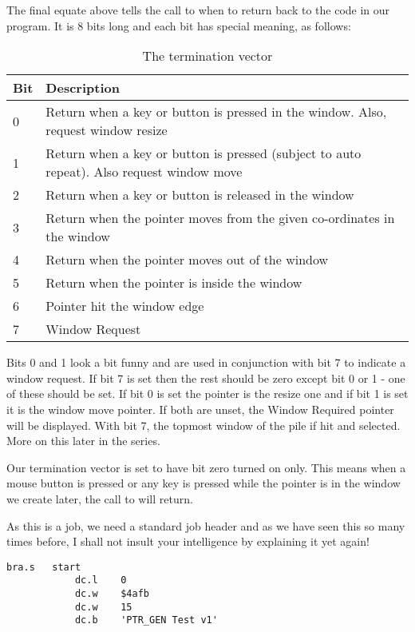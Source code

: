 The final equate above tells the call to  when to return back to the code in
our program. It is 8 bits long and each bit has special meaning, as follows:
\begin{table}[htbp]
\centering
\begin{tabular}{l p{}}
\toprule
\textbf{Bit} & \textbf{Description} \\
\midrule
%
0 & Return when a key or button is pressed in the window. Also, request window resize \\
1 & Return when a key or button is pressed (subject to auto repeat). Also request window move \\
2 & Return when a key or button is released in the window \\
3 & Return when the pointer moves from the given co-ordinates in the window \\
4 & Return when the pointer moves out of the window \\
5 & Return when the pointer is inside the window \\
6 & Pointer hit the window edge \\
7 & Window Request \\
%
\bottomrule
\end{tabular}
\caption{The termination vector}
\label{tab:TerminationVector}
\end{table}

Bits 0 and 1 look a bit funny and are used in conjunction with bit 7 to indicate a
window request. If bit 7 is set then the rest should be zero except bit 0 or 1 -{} one of
these should be set. If bit 0 is set the pointer is the resize one and if bit 1 is set it
is the window move pointer. If both are unset, the Window Required pointer will be
displayed. With bit 7, the topmost window of the pile if hit and selected. More on this
later in the series.

Our termination vector is set to have bit zero turned on only. This means when a
mouse button is pressed or any key is pressed while the pointer is in the window we create
later, the call to  will return.

As this is a job, we need a standard job header and as we have seen this so many
times before, I shall not insult your intelligence by explaining it yet again!

\begin{lstlisting}[firstnumber=last,caption={Simple PE Program - Part 2}]
            bra.s   start
            dc.l    0
            dc.w    $4afb
            dc.w    15
            dc.b    'PTR_GEN Test v1'
\end{lstlisting}

